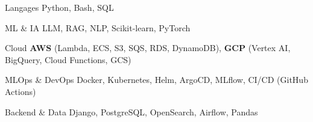 

\begin{cvskills}

  \cvskill
    {Langages} %
    {Python, Bash, SQL} %

  \cvskill
    {ML \& IA} %
    {LLM, RAG, NLP, Scikit-learn, PyTorch} %

  \cvskill
    {Cloud} %
    {\textbf{AWS} (Lambda, ECS, S3, SQS, RDS, DynamoDB), \textbf{GCP} (Vertex AI, BigQuery, Cloud Functions, GCS)} %

  \cvskill
    {MLOps \& DevOps} %
    {Docker, Kubernetes, Helm, ArgoCD, MLflow, CI/CD (GitHub Actions)} %

  \cvskill
    {Backend \& Data} %
    {Django, PostgreSQL, OpenSearch, Airflow, Pandas} %

\end{cvskills}
